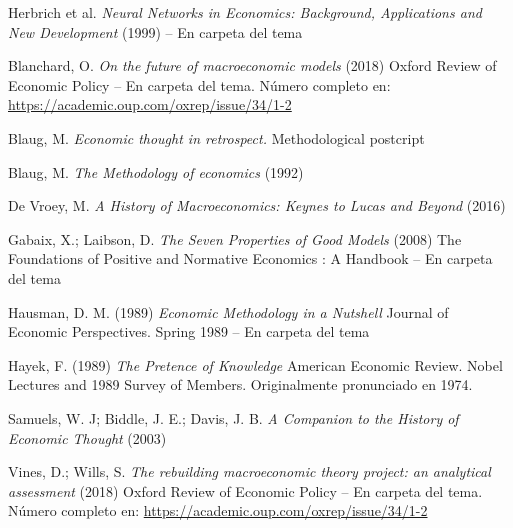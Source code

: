 \documentclass{nuevotema}
\begin{document}
Herbrich et al. \textit{Neural Networks in Economics: Background, Applications and New Development} (1999) -- En carpeta del tema

Blanchard, O. \textit{On the future of macroeconomic models} (2018) Oxford Review of Economic Policy -- En carpeta del tema. Número completo en: \url{https://academic.oup.com/oxrep/issue/34/1-2}

Blaug, M. \textit{Economic thought in retrospect.} Methodological postcript 

Blaug, M. \textit{The Methodology of economics} (1992)

De Vroey, M. \textit{A History of Macroeconomics: Keynes to Lucas and Beyond} (2016)

Gabaix, X.; Laibson, D. \textit{The Seven Properties of Good Models} (2008) The Foundations of Positive and Normative
Economics : A Handbook -- En carpeta del tema

Hausman, D. M. (1989) \textit{Economic Methodology in a Nutshell} Journal of Economic Perspectives. Spring 1989 -- En carpeta del tema

Hayek, F. (1989) \textit{The Pretence of Knowledge} American Economic Review. Nobel Lectures and 1989 Survey of Members. Originalmente pronunciado en 1974.

Samuels, W. J; Biddle, J. E.; Davis, J. B. \textit{A Companion to the History of Economic Thought} (2003)

Vines, D.; Wills, S. \textit{The rebuilding macroeconomic theory project: an analytical assessment} (2018) Oxford Review of Economic Policy -- En carpeta del tema. Número completo en: \url{https://academic.oup.com/oxrep/issue/34/1-2}
\end{document}
